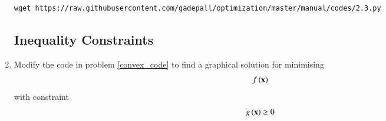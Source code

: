 \documentclass[journal,12pt,twocolumn]{IEEEtran}
\renewcommand\thesection{\arabic{section}}
\begin{document}
\begin{enumerate}[label=\thesection.\arabic*,ref=\thesection.\theenumi]
\solution
%	
\begin{lstlisting}
wget https://raw.githubusercontent.com/gadepall/optimization/master/manual/codes/2.3.py
\end{lstlisting}
\subsection{Inequality Constraints}

%
\item
\label{ch2_constraint}
Modify the code in problem \ref{convex_code} to find a graphical solution for minimising
\begin{align}
f\left(\mathbf{x}\right) 
\end{align}
with constraint
\begin{align}
g\left(\mathbf{x}\right) \geq 0
\end{align}


\end{enumerate}
\end{document}
